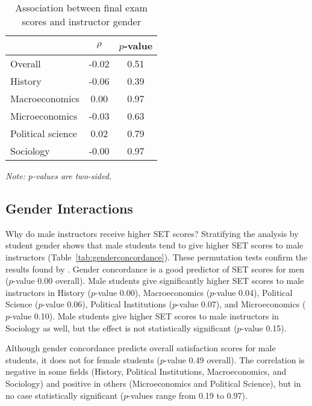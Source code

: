 \documentclass[12pt]{article}
\begin{document}
\begin{table}[htbp]
  \centering
  \footnotesize 
  \caption{Association between final exam scores and instructor gender}
    \begin{tabular}{lcc}
    \toprule 
                     & $\rho$  & $p$-value    \\
   \midrule
    Overall &            -0.02       & 0.51      \\
    History &            -0.06       & 0.39      \\
    Macroeconomics &      0.00       & 0.97      \\
    Microeconomics &     -0.03       & 0.63      \\
    Political science &  0.02       & 0.79      \\
    Sociology &          -0.00       & 0.97      \\
    \bottomrule
    \end{tabular}%
 \label{tab:genderfinal}%
 
  \textit{Note: $p$-values are two-sided.}
\end{table}%
\normalsize


\subsection{Gender Interactions}
Why do male instructors receive higher SET scores? 
Stratifying the analysis by student gender shows that
male students tend to give higher SET scores to male instructors 
(Table~\ref{tab:genderconcordance}). 
These permutation tests confirm the results found by \citet{Boring2015}. 
Gender concordance is a good predictor of SET scores for men ($p$-value 0.00 overall). 
Male students give significantly higher SET scores to male instructors in  
History ($p$-value 0.00), Macroeconomics ($p$-value 0.04), Political Science ($p$-value 0.06), 
Political Institutions ($p$-value 0.07), and Microeconomics ($p$-value 0.10). 
Male students give higher SET scores to male instructors in Sociology as well, but the
effect is not statistically significant ($p$-value 0.15). 

Although gender concordance predicts overall satisfaction scores for male students, 
it does not for female students ($p$-value 0.49 overall). 
The correlation is negative in some fields (History, Political Institutions, 
Macroeconomics, and Sociology) and positive in others 
(Microeconomics and Political Science), but in no case statistically significant 
($p$-values range from 0.19 to 0.97).
\end{document}
